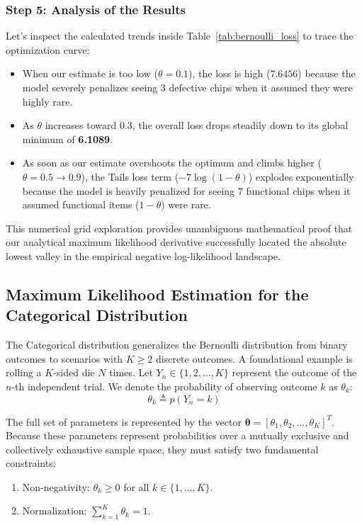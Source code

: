 \documentclass{article}
\begin{document}
\subsubsection{Step 5: Analysis of the Results}
Let's inspect the calculated trends inside Table~\ref{tab:bernoulli_loss} to trace the optimization curve:
\begin{itemize}
    \item When our estimate is too low ($\theta = 0.1$), the loss is high ($7.6456$) because the model severely penalizes seeing $3$ defective chips when it assumed they were highly rare.
    \item As $\theta$ increases toward $0.3$, the overall loss drops steadily down to its global minimum of \textbf{6.1089}.
    \item As soon as our estimate overshoots the optimum and climbs higher ($\theta = 0.5 \to 0.9$), the Tails loss term ($-7\log(1-\theta)$) explodes exponentially because the model is heavily penalized for seeing $7$ functional chips when it assumed functional items ($1-\theta$) were rare.
\end{itemize}

This numerical grid exploration provides unambiguous mathematical proof that our analytical maximum likelihood derivative successfully located the absolute lowest valley in the empirical negative log-likelihood landscape.

\subsection{Maximum Likelihood Estimation for the Categorical Distribution}

The Categorical distribution generalizes the Bernoulli distribution from binary outcomes to scenarios with $K \ge 2$ discrete outcomes. A foundational example is rolling a $K$-sided die $N$ times. Let $Y_n \in \{1, 2, \dots, K\}$ represent the outcome of the $n$-th independent trial. We denote the probability of observing outcome $k$ as $\theta_k$:
\begin{equation}
\theta_k \triangleq p(Y_n = k)
\end{equation}

The full set of parameters is represented by the vector $\boldsymbol{\theta} = [\theta_1, \theta_2, \dots, \theta_K]^T$. Because these parameters represent probabilities over a mutually exclusive and collectively exhaustive sample space, they must satisfy two fundamental constraints:
\begin{enumerate}
    \item Non-negativity: $\theta_k \ge 0$ for all $k \in \{1, \dots, K\}$.
    \item Normalization: $\sum_{k=1}^K \theta_k = 1$.
\end{enumerate}
\end{document}
